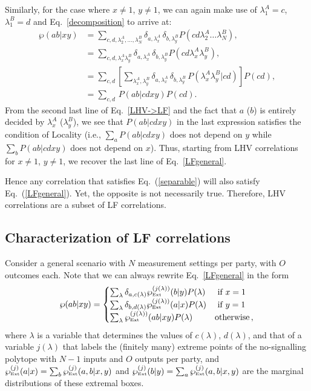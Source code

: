 \documentclass[aps,prx,twocolumn,superscriptaddress]{revtex4-1}
\theoremstyle{plain}
\newcommand{\Pext}{\wp_\text{\tiny Ext}}
\begin{document}
Similarly, for the case where $x\neq1$, $y\neq 1$, we can again make use of $\lambda^A_{1}=c$, $\lambda^B_{1}=d$ and Eq.~\eqref{decomposition} to arrive at:
\begin{equation}\label{LHV->LF}
\begin{split}
	\wp(ab|xy)&=\sum_{c,d,\lambda^A_2,\ldots,\lambda^B_N} \delta_{a,\lambda^A_{x}}\,\delta_{b,\lambda^B_{y}} P(cd\lambda^A_2\ldots\lambda^B_N),\\
		     &=\sum_{c,d,\lambda^A_x\lambda^B_y} \delta_{a,\lambda^A_{x}}\,\delta_{b,\lambda^B_{y}} P(cd\lambda^A_{x}\lambda^B_y),\\
		     &=\sum_{c,d} \left[\sum_{\lambda^A_{x},\lambda^B_y} \delta_{a,\lambda^A_{x}}\,\delta_{b,\lambda^B_{y}} \,P(\lambda^A_{x}\lambda^B_{y}|cd)\right] P(cd),\\
		     &=\sum_{c,d} \,P(ab|cdxy) P(cd).
\end{split}
\end{equation}
From the second last line of Eq.~\eqref{LHV->LF} and the fact that $a$ ($b$) is entirely decided by $\lambda^A_x$ ($\lambda^B_y$),  we see that $P(ab|cdxy)$ in the last expression satisfies the condition of {Locality} (i.e., $\sum_a P(ab|cdxy)$ does not depend on $y$ while $\sum_b P(ab|cdxy)$ does not depend on $x$). Thus, starting from LHV correlations for $x\neq1$, $y\neq1$, we recover the last line of Eq.~\eqref{LFgeneral}.

Hence any correlation that satisfies Eq.~(\ref{separable}) will also satisfy Eq.~(\ref{LFgeneral}). Yet, the opposite is not necessarily true. Therefore, LHV correlations are a subset of LF correlations. 


\subsection{Characterization of LF correlations}\label{characterization_section}
Consider a general scenario with $N$ measurement settings per party, with $O$ outcomes each. Note that we can always rewrite Eq.~\eqref{LFgeneral} in the form 
\begin{equation}
\label{LFgeneralDet}
\wp(ab|xy)=\begin{cases}
\sum_{\lambda}\delta_{a,c(\lambda)}\Pext^{(j(\lambda))}(b|y)P(\lambda) & \text{ if } x=1 \\ 
\sum_{\lambda}\delta_{b,d(\lambda)}\Pext^{(j(\lambda))}(a|x)P(\lambda) & \text{ if } y=1 \\ 
\sum_{\lambda}\Pext^{(j(\lambda))}(ab|xy)P(\lambda) & \text{{otherwise}}
\, ,
\end{cases}
\end{equation}
where $\lambda$ is a variable that determines the values of $c(\lambda)$, $d(\lambda)$, and that of a variable $j(\lambda)$ that labels the (finitely many) extreme points of the no-signalling polytope with $N-1$ inputs and $O$ outputs per party, and $\Pext^{(j)}(a|x)=\sum_b \Pext^{(j)}(a,b|x,y)$ and $\Pext^{(j)}(b|y)=\sum_a \Pext^{(j)}(a,b|x,y)$ are the marginal distributions of these extremal boxes. 
\end{document}
